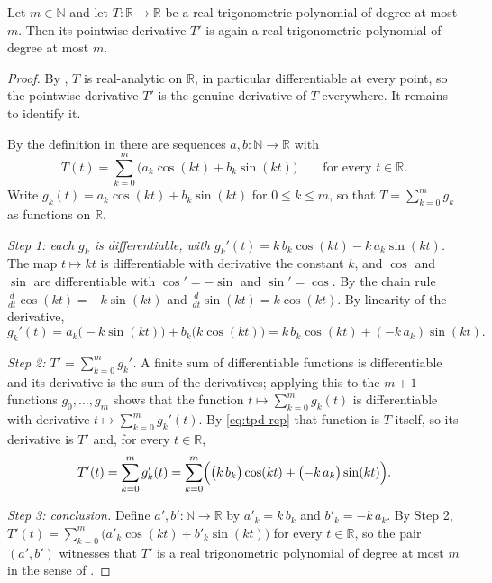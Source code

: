 \begin{lemma}
Let $m\in\mathbb{N}$ and let $T:\mathbb{R}\to\mathbb{R}$ be a real
trigonometric polynomial of degree at most $m$. Then its pointwise derivative
$T'$ is again a real trigonometric polynomial of degree at most $m$.
\end{lemma}
\begin{proof}
By , $T$ is real-analytic on $\mathbb{R}$, in
particular differentiable at every point, so the pointwise derivative $T'$ is
the genuine derivative of $T$ everywhere. It remains to identify it.

By the definition in  there are sequences
$a,b:\mathbb{N}\to\mathbb{R}$ with
\begin{equation}\label{eq:tpd-rep}
  T(t)=\sum_{k=0}^{m}\bigl(a_k\cos(kt)+b_k\sin(kt)\bigr)
  \qquad\text{for every }t\in\mathbb{R}.
\end{equation}
Write $g_k(t)=a_k\cos(kt)+b_k\sin(kt)$ for $0\le k\le m$, so that
$T=\sum_{k=0}^{m}g_k$ as functions on $\mathbb{R}$.

\emph{Step 1: each $g_k$ is differentiable, with
$g_k'(t)=k\,b_k\cos(kt)-k\,a_k\sin(kt)$.} The map $t\mapsto kt$ is
differentiable with derivative the constant $k$, and $\cos$ and $\sin$ are
differentiable with $\cos'=-\sin$ and $\sin'=\cos$. By the chain rule
$\frac{d}{dt}\cos(kt)=-k\sin(kt)$ and $\frac{d}{dt}\sin(kt)=k\cos(kt)$. By
linearity of the derivative,
\[
  g_k'(t)=a_k\bigl(-k\sin(kt)\bigr)+b_k\bigl(k\cos(kt)\bigr)
        =k\,b_k\cos(kt)+(-k\,a_k)\sin(kt).
\]

\emph{Step 2: $T'=\sum_{k=0}^{m}g_k'$.} A finite sum of differentiable
functions is differentiable and its derivative is the sum of the derivatives;
applying this to the $m+1$ functions $g_0,\dots,g_m$ shows that the function
$t\mapsto\sum_{k=0}^{m}g_k(t)$ is differentiable with derivative
$t\mapsto\sum_{k=0}^{m}g_k'(t)$. By \eqref{eq:tpd-rep} that function is $T$
itself, so its derivative is $T'$ and, for every $t\in\mathbb{R}$,
\[
  T'(t)=\sum_{k=0}^{m}g_k'(t)
       =\sum_{k=0}^{m}\Bigl(\bigl(k\,b_k\bigr)\cos(kt)
         +\bigl(-k\,a_k\bigr)\sin(kt)\Bigr).
\]

\emph{Step 3: conclusion.} Define $a',b':\mathbb{N}\to\mathbb{R}$ by
$a'_k=k\,b_k$ and $b'_k=-k\,a_k$. By Step 2,
$T'(t)=\sum_{k=0}^{m}\bigl(a'_k\cos(kt)+b'_k\sin(kt)\bigr)$ for every
$t\in\mathbb{R}$, so the pair $(a',b')$ witnesses that $T'$ is a real
trigonometric polynomial of degree at most $m$ in the sense of
.
\end{proof}
